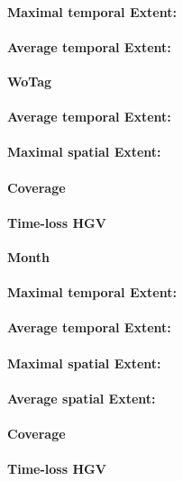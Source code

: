 \paragraph{Maximal temporal Extent:}
\paragraph{Average temporal Extent:}


\large
\centerline{\textbf{WoTag}}
\normalsize

\paragraph{Average temporal Extent:}
\paragraph{Maximal spatial Extent:}
\paragraph{Coverage}
\paragraph{Time-loss HGV}

\large
\centerline{\textbf{Month}}
\normalsize

\paragraph{Maximal temporal Extent:}
\paragraph{Average temporal Extent:}
\paragraph{Maximal spatial Extent:}
\paragraph{Average spatial Extent:}
\paragraph{Coverage}
\paragraph{Time-loss HGV}